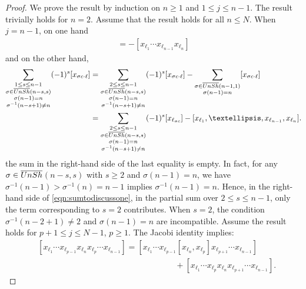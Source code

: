 \documentclass[10pt,a4paper]{amsart}
\begin{document}
\begin{proof} We prove the result by induction on $n\geq 1$ and $1\leq j \leq n-1$. The result trivially holds for $n=2$. Assume that the result holds for all $n\leq N$. When $j=n-1$, on one hand
\begin{align}
[x_{\ell_1}\cdots x_{\ell_n}x_{\ell_{n-1}}] = -[x_{\ell_1}\cdots x_{\ell_{n-1}}x_{\ell_n}]
\end{align}
and on the other hand, 
\begin{align}
\sum_{\substack{1\leq s \leq n-1\\ \sigma \in \overline{\rm UnSh}{(n-s,s)} \\ \sigma(n-1)=n \\ \sigma^{-1}(n-s+1)\neq n}} (-1)^{s}[x_{\sigma c\cdot \ell}] & = \sum_{\substack{2\leq s \leq n-1\\\sigma \in \overline{\rm UnSh}{(n-s,s)} \\ \sigma(n-1)=n \\ \sigma^{-1}(n-s+1)\neq n}} (-1)^{s}[x_{\sigma c\cdot \ell}] -\sum_{\substack{\sigma \in \overline{\rm UnSh}(n-1,1)\\ \sigma(n-1)=n}}[x_{\sigma c \cdot \ell}] \\ 
&= \sum_{\substack{2\leq s \leq n-1\\\sigma \in \overline{\rm UnSh}{(n-s,s)} \\ \sigma(n-1)=n \\ \sigma^{-1}(n-s+1)\neq n}} (-1)^{s}[x_{\ell_{\sigma c}}] -[x_{\ell_1},\ldots,x_{\ell_{n-1}},x_{\ell_{n}}] \label{eqn:sumtodiscussone}.
\end{align}
the sum in the right-hand side of the last equality is empty. In fact, for any $\sigma \in {\rm \overline{UnSh}}$$(n-s,s)$ with $s\geq 2$ and $\sigma(n-1)=n$, we have $\sigma^{-1}(n-1) > \sigma^{-1}(n) = n-1 $ implies $\sigma^{-1}(n-1)=n$. Hence, in the right-hand side of \eqref{eqn:sumtodiscussone}, in the partial sum over $2\leq s \leq n-1$, only the term corresponding to $s=2$ contributes. When $s=2$, the condition $\sigma^{-1}(n-2+1)\neq 2$ and $\sigma(n-1)=n$ are incompatible.
Assume the result holds for $p+1 \leq j \leq N-1$, $p\geq 1$. The Jacobi identity implies:
\begin{align*}
&[x_{\ell_1}\cdots x_{\ell_{p-1}} x_{\ell_n} x_{\ell_p} \cdots x_{\ell_{n-1}}] = [x_{\ell_1} \cdots x_{\ell_{p-1}} [x_{\ell_n},x_{\ell_p}] x_{\ell_{p+1}} \cdots x_{\ell_{n-1}}] \\ 
&\hspace{7cm}+[x_{\ell_1}\cdots x_{\ell_{p}} x_{\ell_n} x_{\ell_{p+1}} \cdots x_{\ell_{n-1}}]. 

\end{align*}$$
\end{proof}
\end{document}
